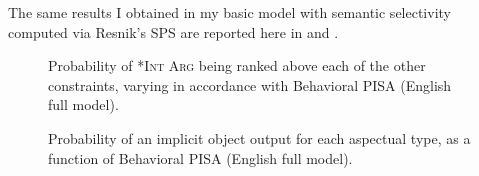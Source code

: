 The same results I obtained in my basic model with semantic selectivity computed via Resnik's SPS are reported here in  and .


\begin{figure}[htb]
\caption{Probability of \textsc{*Int Arg} being ranked above each of the other constraints, varying in accordance with Behavioral PISA (English full model).}
    
\end{figure}

\begin{figure}[htb]
\caption{Probability of an implicit object output for each aspectual type, as a function of Behavioral PISA (English full model).}
    
\end{figure}

